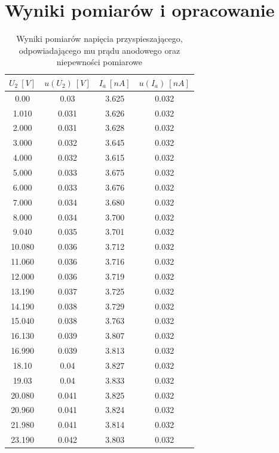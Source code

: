 \documentclass[12pt, a4paper, oneside]{article}
\begin{document}
\section{Wyniki pomiarów i opracowanie}
\begin{longtable}{|c|c|c|c|}
\caption{Wyniki pomiarów napięcia przyspieszającego, odpowiadającego mu prądu anodowego oraz niepewności pomiarowe}
\label{variability_impl_mech}
\endfirsthead
\endhead
\hline
    $U_2~[V]$ & $u(U_2)~[V]$ & $I_a~[nA]$ & $u(I_a)~[nA]$ \\\hline
    0.00 & 0.03 & 3.625 & 0.032 \\\hline
    1.010 & 0.031 & 3.626 & 0.032 \\\hline
    2.000 & 0.031 & 3.628 & 0.032 \\\hline
    3.000 & 0.032 & 3.645 & 0.032 \\\hline
    4.000 & 0.032 & 3.615 & 0.032 \\\hline
    5.000 & 0.033 & 3.675 & 0.032 \\\hline
    6.000 & 0.033 & 3.676 & 0.032 \\\hline
    7.000 & 0.034 & 3.680 & 0.032 \\\hline
    8.000 & 0.034 & 3.700 & 0.032 \\\hline
    9.040 & 0.035 & 3.701 & 0.032 \\\hline
    10.080 & 0.036 & 3.712 & 0.032 \\\hline
    11.060 & 0.036 & 3.716 & 0.032 \\\hline
    12.000 & 0.036 & 3.719 & 0.032 \\\hline
    13.190 & 0.037 & 3.725 & 0.032 \\\hline
    14.190 & 0.038 & 3.729 & 0.032 \\\hline
    15.040 & 0.038 & 3.763 & 0.032 \\\hline
    16.130 & 0.039 & 3.807 & 0.032 \\\hline
    16.990 & 0.039 & 3.813 & 0.032 \\\hline
    18.10 & 0.04 & 3.827 & 0.032 \\\hline
    19.03 & 0.04 & 3.833 & 0.032 \\\hline
    20.080 & 0.041 & 3.825 & 0.032 \\\hline
    20.960 & 0.041 & 3.824 & 0.032 \\\hline
    21.980 & 0.041 & 3.814 & 0.032 \\\hline
    23.190 & 0.042 & 3.803 & 0.032 \\\hline

\end{longtable}
\end{document}
